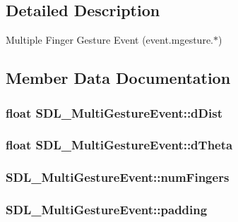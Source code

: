 \subsection{Detailed Description}
Multiple Finger Gesture Event (event.\-mgesture.$\ast$) 

\subsection{Member Data Documentation}
\hypertarget{struct_s_d_l___multi_gesture_event_a351c29785c5ce3f68c4591a427265f14}{
\subsubsection[{d\-Dist}]{\setlength{\rightskip}{0pt plus 5cm}float S\-D\-L\-\_\-\-Multi\-Gesture\-Event\-::d\-Dist}}\label{struct_s_d_l___multi_gesture_event_a351c29785c5ce3f68c4591a427265f14}
\hypertarget{struct_s_d_l___multi_gesture_event_a4f4a920dcf5205baa24a140df56f3153}{
\subsubsection[{d\-Theta}]{\setlength{\rightskip}{0pt plus 5cm}float S\-D\-L\-\_\-\-Multi\-Gesture\-Event\-::d\-Theta}}\label{struct_s_d_l___multi_gesture_event_a4f4a920dcf5205baa24a140df56f3153}
\hypertarget{struct_s_d_l___multi_gesture_event_a6b06cf80372ce3cad40110fdb6ef0353}{
\subsubsection[{num\-Fingers}]{ S\-D\-L\-\_\-\-Multi\-Gesture\-Event\-::num\-Fingers}}\label{struct_s_d_l___multi_gesture_event_a6b06cf80372ce3cad40110fdb6ef0353}
\hypertarget{struct_s_d_l___multi_gesture_event_a4804ec87789e697aba138c4888bb304b}{
\subsubsection[{padding}]{ S\-D\-L\-\_\-\-Multi\-Gesture\-Event\-::padding}}\label{struct_s_d_l___multi_gesture_event_a4804ec87789e697aba138c4888bb304b}
